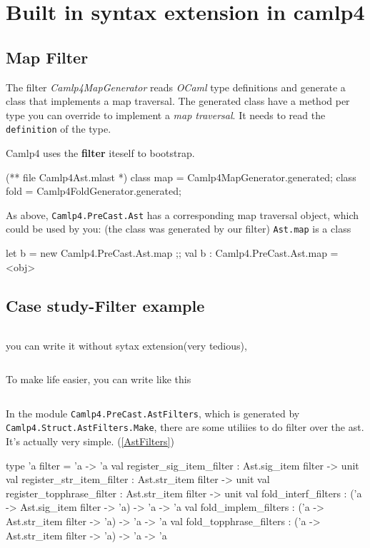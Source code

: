 \section{Built in syntax extension in camlp4}


\subsection{Map Filter}
\label{transform}


The filter \emph{Camlp4MapGenerator} reads \emph{OCaml} type
definitions and generate a class that implements a map traversal.  The
generated class have a method per type you can override to implement a
\emph{map traversal}. It needs to read the \verb|definition| of the
type.

Camlp4 uses the \textbf{ filter} iteself to bootstrap.


\begin{ocamlcode}
(** file Camlp4Ast.mlast *)
class map = Camlp4MapGenerator.generated;
class fold = Camlp4FoldGenerator.generated;
\end{ocamlcode}

As above, \verb|Camlp4.PreCast.Ast| has a corresponding map traversal
object, which could be used by you: (the class was generated by our
filter) \verb|Ast.map| is a class
\begin{ocamlcode}
let b = new Camlp4.PreCast.Ast.map ;;
val b : Camlp4.PreCast.Ast.map = <obj>
\end{ocamlcode}

\subsection{Case study-Filter example}
\inputminted[fontsize=\scriptsize, fontsize=\scriptsize, firstline=1,lastline=9]{ocaml}{camlp4/code/ast_add_zero.ml}
you can write it without sytax extension(very tedious),
\inputminted[fontsize=\scriptsize, fontsize=\scriptsize, firstline=11,lastline=31]{ocaml}{camlp4/code/ast_add_zero.ml}
To make life easier, you can write like this 
\inputminted[fontsize=\scriptsize, fontsize=\scriptsize, firstline=32,lastline=38]{ocaml}{camlp4/code/ast_add_zero.ml}

In the module \verb|Camlp4.PreCast.AstFilters|, which is generated by
\verb|Camlp4.Struct.AstFilters.Make|, there are some utiliies to do
filter over the ast. It's actually very simple. (\ref{AstFilters})
\begin{ocamlcode}
    type 'a filter = 'a -> 'a
    val register_sig_item_filter : Ast.sig_item filter -> unit
    val register_str_item_filter : Ast.str_item filter -> unit
    val register_topphrase_filter : Ast.str_item filter -> unit
    val fold_interf_filters : ('a -> Ast.sig_item filter -> 'a) -> 'a -> 'a
    val fold_implem_filters : ('a -> Ast.str_item filter -> 'a) -> 'a -> 'a
    val fold_topphrase_filters :
      ('a -> Ast.str_item filter -> 'a) -> 'a -> 'a
\end{ocamlcode}


